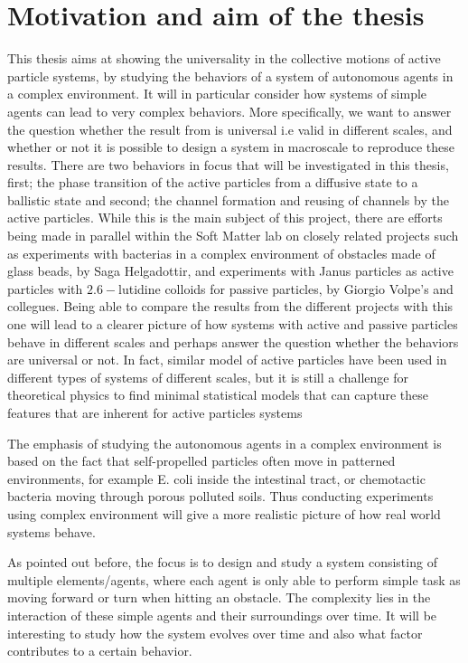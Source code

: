 \section{Motivation and aim of the thesis}

This thesis aims at showing the universality in the collective motions of active particle systems, 
by studying the behaviors of a system of autonomous agents in a complex environment. 
It will in particular consider how systems of simple agents can lead to very complex behaviors. 
More specifically, we want to answer the question whether the result from \cite{nilsson2017metastable} is 
universal i.e valid in different scales, and whether or not it is possible to design a system in 
macroscale to reproduce these results. There are two behaviors in focus that will be investigated 
in this thesis, first; the phase transition of the active particles from a diffusive state to a ballistic state and 
second; the channel formation and reusing of channels by the active particles. While this is the main subject of 
this project, there are efforts being made in parallel within the Soft Matter lab on closely related projects such as 
experiments with bacterias in a complex environment of obstacles made of glass beads, by Saga Helgadottir, and 
experiments with Janus particles as active particles with $\num{2.6}-$lutidine colloids for passive particles, by 
Giorgio Volpe's and collegues. Being able to compare the results from the different projects with this one 
will lead to a clearer picture of how systems with active and passive particles behave in different 
scales and perhaps answer the question whether the behaviors are universal or not. In fact, similar model 
of active particles have been used in different types of systems of different scales, but it is still a challenge 
for theoretical physics to find minimal statistical models that can capture these features that are inherent 
for active particles systems\cite{toner2005hydrodynamics, li2008minimal, bertin2009hydrodynamic}

The emphasis of studying the autonomous agents in a complex environment is based on the 
fact that self-propelled particles often move in patterned environments, for example E. coli 
inside the intestinal tract\cite{berg2008coli}, or chemotactic bacteria moving through porous 
polluted soils\cite{ford2007role}. Thus conducting experiments using complex environment 
will give a more realistic picture of how real world systems behave.
 
As pointed out before, the focus is to design and study a system consisting of multiple elements/agents, where 
each agent is only able to perform simple task as moving forward or turn when hitting an obstacle. The 
complexity lies in the interaction of these simple agents and their surroundings over time. It will be 
interesting to study how the system evolves over time and also what factor contributes to a certain behavior. 
